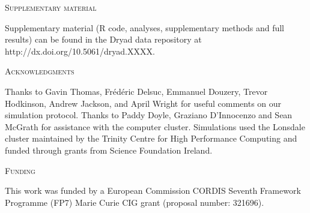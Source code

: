 \documentclass[12pt,letterpaper]{article}
\renewcommand{\section}[1]{%
\bigskip
\begin{center}
\begin{Large}
\normalfont\scshape #1
\medskip
\end{Large}
\end{center}}
\begin{document}
%
%
\section{Supplementary material}
Supplementary material (R code, analyses, supplementary methods and full results) can be found in the Dryad data repository at http://dx.doi.org/10.5061/dryad.XXXX.

\section{Acknowledgments}
Thanks to Gavin Thomas, Fr\'{e}d\'{e}ric Delsuc, Emmanuel Douzery, Trevor Hodkinson, Andrew Jackson, and April Wright for useful comments on our simulation protocol. Thanks to Paddy Doyle, Graziano D'Innocenzo and Sean McGrath for assistance with the computer cluster. Simulations used the Lonsdale cluster maintained by the Trinity Centre for High Performance Computing and funded through grants from Science Foundation Ireland. 

\section{Funding}
This work was funded by a European Commission CORDIS Seventh Framework Programme (FP7) Marie Curie CIG grant (proposal number: 321696).






%
%

\end{document}
